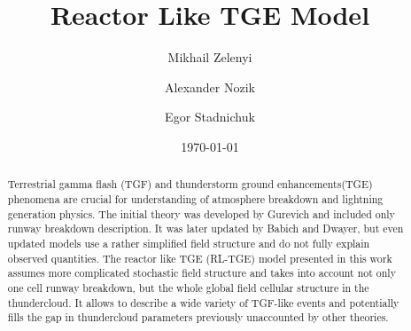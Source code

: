 \documentclass[%
 aip,
cp,  %
 amsmath,amssymb,%
 reprint,%
]{revtex4-2}
\begin{document}
\title{Reactor Like TGE Model}%

\author{Mikhail Zelenyi} %
%
\author{Alexander Nozik}%
\author{Egor Stadnichuk}
%


\date{\today} %

\begin{abstract}
Terrestrial gamma flash (TGF) and thunderstorm ground enhancements(TGE) phenomena are crucial for understanding of atmosphere breakdown and lightning generation physics. The initial theory was developed by Gurevich and included only runway breakdown description. It was later updated by Babich and Dwayer, but even updated models use a rather simplified field structure and do not fully explain observed quantities. The reactor like TGE (RL-TGE) model presented in this work assumes more complicated stochastic field structure and takes into account not only one cell runway breakdown, but the whole global field cellular structure in the thundercloud. It allows to describe a wide variety of TGF-like events and potentially fills the gap in thundercloud parameters previously unaccounted by other theories.
\end{abstract}

\maketitle
\end{document}
